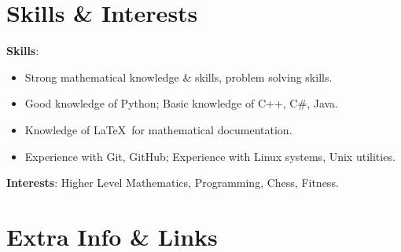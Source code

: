 \documentclass[letterpaper,11pt]{article}
\newcommand{\resumeItem}[1]{
  \item\small{
    {#1 \vspace{-2pt}}
  }
}
\newcommand{\resumeItemListStart}{\begin{itemize}}
\newcommand{\resumeItemListEnd}{\end{itemize}\vspace{-5pt}}
\begin{document}
\section{Skills \& Interests}
 \begin{itemize}[leftmargin=0.15in, label={}]
    \small{\item{
    \vspace{1mm}
     \textbf{Skills}{:} \\
    \resumeItemListStart
        \vspace{-2mm}
        \resumeItem{Strong mathematical knowledge \& skills, problem solving skills.}
        \resumeItem {Good knowledge of Python; Basic knowledge of C++, C\#, Java.}
        \resumeItem {Knowledge of \LaTeX\ for mathematical documentation.}
        \resumeItem {Experience with Git, GitHub; Experience with Linux systems, Unix utilities.}
    \resumeItemListEnd
     \vspace{1mm}
     \textbf{Interests}{: Higher Level Mathematics, Programming, Chess, Fitness.} \\
     \vspace{1mm}

    }}
 \end{itemize}

\section{Extra Info \& Links}
\end{document}
